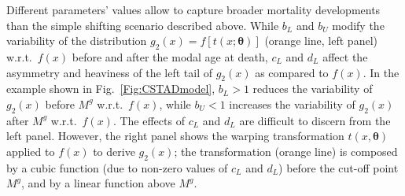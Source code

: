 \documentclass[11pt, a4paper]{article}
\begin{document}
Different parameters' values allow to capture broader mortality developments than the simple shifting scenario described above. While $b_L$ and $b_U$ modify the variability of the distribution $g_2(x)=f\left[t(x;\bm{\theta})\right]$ (orange line, left panel) w.r.t.~$f(x)$ before and after the modal age at death, $c_L$ and $d_L$ affect the asymmetry and heaviness of the left tail of $g_2(x)$ as compared to $f(x)$. In the example shown in Fig.~\ref{Fig:CSTADmodel}, $b_L > 1$ reduces the variability of $g_2(x)$ before $M^g$ w.r.t.~$f(x)$, while $b_U < 1$ increases the variability of $g_2(x)$ after $M^g$ w.r.t.~$f(x)$. The effects of $c_L$ and $d_L$ are difficult to discern from the left panel. However, the right panel shows the warping transformation $t(x,\bm{\theta})$ applied to $f(x)$ to derive $g_2(x)$; the transformation (orange line) is composed by a cubic function (due to non-zero values of $c_L$ and $d_L$) before the cut-off point $M^g$, and by a linear function above $M^g$. \par
\end{document}
